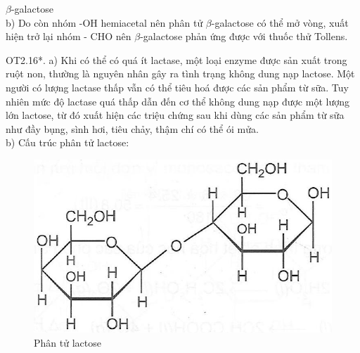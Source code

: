 \documentclass[10pt]{article}
\begin{document}
$\beta$-galactose\\
b) Do còn nhóm -OH hemiacetal nên phân tử $\beta$-galactose có thể mở vòng, xuất hiện trở lại nhóm - CHO nên $\beta$-galactose phản ứng được với thuốc thử Tollens.

OT2.16*. a) Khi có thể có quá ít lactase, một loại enzyme được sản xuất trong ruột non, thường là nguyên nhân gây ra tình trạng không dung nạp lactose. Một người có lượng lactase thấp vẫn có thể tiêu hoá được các sản phẩm từ sữa. Tuy nhiên mức độ lactase quá thấp dẫn đến cơ thể không dung nạp được một lượng lớn lactose, từ đó xuất hiện các triệu chứng sau khi dùng các sản phẩm từ sữa như đầy bụng, sình hơi, tiêu chảy, thậm chí có thể ói mửa.\\
b) Cấu trúc phân tử lactose:

\begin{figure}[h]
\begin{center}
  \includegraphics[width=\textwidth]{2025_10_23_b4e16b74380d0f7e7700g-041(1)}
\captionsetup{labelformat=empty}
\caption{Phân tử lactose}
\end{center}
\end{figure}
\end{document}
